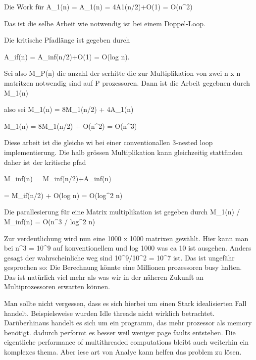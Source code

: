 Die Work für A_1(n) = A_1(n) = 4A1(n/2)+O(1) = O(n^2)

Das ist die selbe Arbeit wie notwendig ist bei einem Doppel-Loop.


Die kritische Pfadlänge ist gegeben durch 

A_if(n) = A_inf(n/2)+O(1) = O(log n).


Sei also M_P(n) die anzahl der scrhitte die zur Multiplikation von zwei n x n matritzen notwendig sind auf P prozessoren. Dann ist die Arbeit gegebnen durch M_1(n) 

also sei
M_1(n) = 8M_1(n/2) + 4A_1(n)

M_1(n) = 8M_1(n/2) + O(n^2)
= O(n^3)


Diese arbeit ist die gleiche wi bei einer conventionallen 3-nested loop implementierung. Die halb grössen Multiplikation kann gleichzeitig stattfinden daher ist der kritische pfad

M_inf(n) = M_inf(n/2)+A_inf(n)

= M_if(n/2) + O(log n)
= O(log^2 n)

Die parallesierung für eine Matrix multiplikation ist gegeben durch M_1(n) / M_inf(n) = O(n^3 / log^2 n)


Zur verdeutlichung wird nun eine 1000 x 1000 matrixen gewählt. Hier kann man bei 
n^3 = 10^9 
auf konventionellem und log 1000 was ca 10 ist ausgehen. Anders gesagt der wahrscheinliche weg sind 
10^9/10^2 = 10^7 
ist. Das ist ungefähr gesprochen so: Die Berechnung könnte eine Millionen prozessoren busy halten. Das ist natürlich viel mehr als was wir in der näheren Zukunft an Multiprozessoren erwarten können. 


Man sollte nicht vergessen, dass es sich hierbei um einen Stark idealisierten Fall handelt. Beispielsweise wurden Idle threads nicht wirklich betrachtet. Darüberhinaus handelt es sich um ein programm, das mehr prozessor als memory benötigt. dadurch performt es besser weil weniger page faults entstehen. Die eigentliche performance of multithreaded computations bleibt auch weiterhin ein komplexes thema. Aber iese art von Analye kann helfen das problem zu lösen.